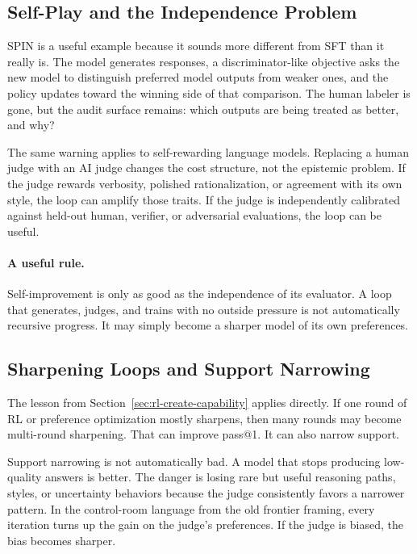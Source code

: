 \subsection{Self-Play and the Independence Problem}

SPIN is a useful example because it sounds more different from SFT than it really is. The model generates responses, a discriminator-like objective asks the new model to distinguish preferred model outputs from weaker ones, and the policy updates toward the winning side of that comparison. The human labeler is gone, but the audit surface remains: which outputs are being treated as better, and why?

The same warning applies to self-rewarding language models. Replacing a human judge with an AI judge changes the cost structure, not the epistemic problem. If the judge rewards verbosity, polished rationalization, or agreement with its own style, the loop can amplify those traits. If the judge is independently calibrated against held-out human, verifier, or adversarial evaluations, the loop can be useful.

\paragraph{A useful rule.} Self-improvement is only as good as the independence of its evaluator. A loop that generates, judges, and trains with no outside pressure is not automatically recursive progress. It may simply become a sharper model of its own preferences.

\subsection{Sharpening Loops and Support Narrowing}

The lesson from Section~\ref{sec:rl-create-capability} applies directly. If one round of RL or preference optimization mostly sharpens, then many rounds may become multi-round sharpening. That can improve pass@1. It can also narrow support.

Support narrowing is not automatically bad. A model that stops producing low-quality answers is better. The danger is losing rare but useful reasoning paths, styles, or uncertainty behaviors because the judge consistently favors a narrower pattern. In the control-room language from the old frontier framing, every iteration turns up the gain on the judge's preferences. If the judge is biased, the bias becomes sharper.

